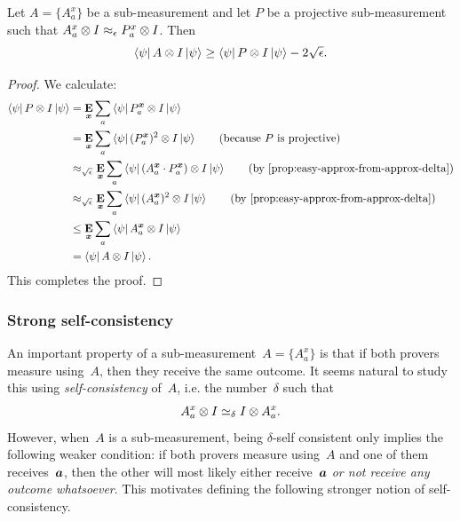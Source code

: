 \begin{proposition}\label{prop:completeness-transfer-projective-P}
Let $A = \{A^x_a\}$ be a sub-measurement 
and let $P$ be a projective sub-measurement such that $A^x_a \otimes I \approx_{\epsilon} P_a^x \otimes I$.
Then
\begin{equation*}
\bra{\psi} A \otimes I \ket{\psi}
\geq  \bra{\psi} P \otimes I \ket{\psi} - 2\sqrt{\epsilon}.
\end{equation*}
\end{proposition}
\begin{proof}
We calculate:
\begin{align*}
\bra{\psi} P \ot I \ket{\psi}
&= \E_{\bx} \sum_a \bra{\psi} P^{\bx}_a \ot I \ket{\psi} \\
&= \E_{\bx} \sum_a \bra{\psi} (P^{\bx}_a)^2 \ot I \ket{\psi} \tag{because~$P$ is projective}\\
&\approx_{\sqrt{\eps}} \E_{\bx} \sum_a \bra{\psi} (A^{\bx}_a \cdot P^{\bx}_a) \ot I \ket{\psi}
									\tag{by \Cref{prop:easy-approx-from-approx-delta}} \\
&\approx_{\sqrt{\eps}} \E_{\bx} \sum_a \bra{\psi} (A^{\bx}_a)^2 \ot I \ket{\psi}
									\tag{by \Cref{prop:easy-approx-from-approx-delta}} \\
&\leq \E_{\bx} \sum_a \bra{\psi} A^{\bx}_a \ot I \ket{\psi}\\
& = \bra{\psi} A \ot I \ket{\psi}.
\end{align*}
This completes the proof.
\end{proof}

\subsubsection{Strong self-consistency}

An important property of a sub-measurement~$A = \{A^x_a\}$
is that if both provers measure using~$A$,
then they receive the same outcome.
It seems natural to study this using \emph{self-consistency} of~$A$, i.e. the number~$\delta$ such that
\begin{equation*}
A^x_a \otimes I \simeq_{\delta} I \otimes A^x_a.
\end{equation*}
However, when~$A$ is a sub-measurement,
being $\delta$-self consistent
only implies the following weaker condition:
if both provers measure using~$A$ and one of them receives~$\boldsymbol{a}$,
then the other will most likely either receive~$\boldsymbol{a}$ \emph{or not receive any outcome whatsoever}.
This motivates defining the following stronger notion of self-consistency.

